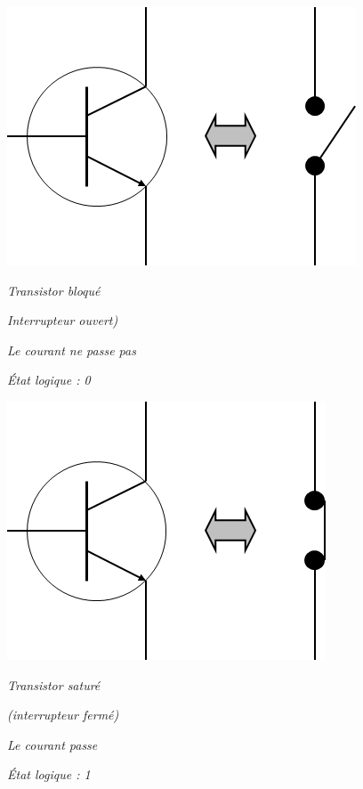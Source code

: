 \documentclass[10pt,fleqn]{article} %
\begin{document}
\begin{minipage}[c]{.45\linewidth}
\begin{center}
\includegraphics[width=.6\textwidth]{images/transistor_bl}

\textit{Transistor bloqué}

\footnotesize{\textit{Interrupteur ouvert)}}

\footnotesize{\textit{Le courant ne passe pas}}

\footnotesize{\textit{État logique : 0}}

\end{center}
\end{minipage}\hfill
\begin{minipage}[c]{.45\linewidth}
\begin{center}
\includegraphics[width=.6\textwidth]{images/transistor_ouv}

\textit{Transistor saturé}

\footnotesize{\textit{(interrupteur fermé)}}

\footnotesize{\textit{Le courant passe}}

\footnotesize{\textit{État logique : 1}}

\end{center}
\end{minipage}
\end{document}
